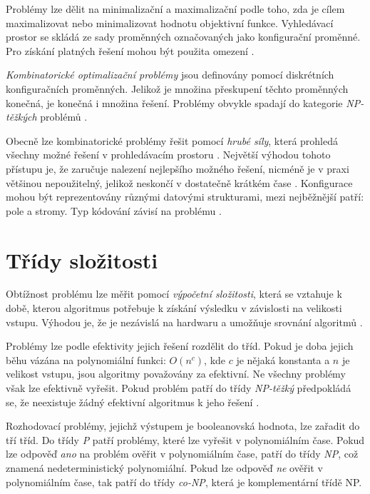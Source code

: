 Problémy lze dělit na minimalizační a maximalizační podle toho, zda je cílem maximalizovat nebo minimalizovat hodnotu objektivní funkce.
Vyhledávací prostor se skládá ze sady proměnných označovaných jako konfigurační proměnné.
Pro získání platných řešení mohou být použita omezení \cite{kirkpatrik, peres}.

\textit{Kombinatorické optimalizační problémy} jsou definovány pomocí diskrétních konfiguračních proměnných.
Jelikož je množina přeskupení těchto proměnných konečná, je konečná i množina řešení.
Problémy obvykle spadají do kategorie \textit{NP-těžkých} problémů \cite{peres}.

Obecně lze  kombinatorické problémy řešit pomocí \textit{hrubé síly}, která prohledá všechny možné řešení v prohledávacím prostoru \cite{peres}.
Největší výhodou tohoto přístupu je, že zaručuje nalezení nejlepšího možného řešení, nicméně je v praxi většinou nepoužitelný, jelikož neskončí v dostatečně krátkém čase \cite{efficient-backtesting}.
Konfigurace mohou být reprezentovány různými datovými strukturami, mezi nejběžnější patří: pole a stromy.
Typ kódování závisí na problému \cite{peres}.

\section{Třídy složitosti}
Obtížnost problému lze měřit pomocí \textit{výpočetní složitosti}, která se vztahuje k době, kterou algoritmus potřebuje k získání výsledku v závislosti na velikosti vstupu.
Výhodou je, že je nezávislá na hardwaru a umožňuje srovnání algoritmů \cite{peres}.

Problémy lze podle efektivity jejich řešení rozdělit do tříd.
Pokud je doba jejich běhu vázána na polynomiální funkci: $O(n^c)$, kde $c$ je nějaká konstanta a $n$ je velikost vstupu, jsou algoritmy považovány za efektivní.
Ne všechny problémy však lze efektivně vyřešit.
Pokud problém patří do třídy \textit{NP-těžký} předpokládá se, že neexistuje žádný efektivní algoritmus k jeho řešení \cite{erickson}.

Rozhodovací problémy, jejichž výstupem je booleanovská hodnota, lze zařadit do tří tříd.
Do třídy \textit{P} patří problémy, které lze vyřešit v polynomiálním čase.
Pokud lze odpověď \textit{ano} na problém ověřit v polynomiálním čase, patří do třídy \textit{NP}, což znamená nedeterministický polynomiální.
Pokud lze odpověď \textit{ne} ověřit v polynomiálním čase, tak patří do třídy \textit{co-NP}, která je komplementární třídě NP.

